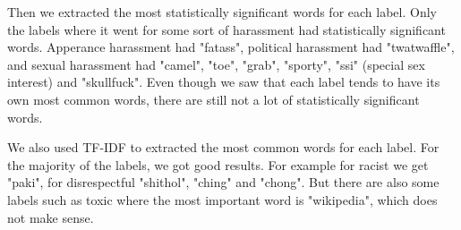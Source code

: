 \documentclass[fleqn,moreauthors,10pt]{ds_report}
\begin{document}
Then we extracted the most statistically significant words for each label. Only the labels where it went for some sort of harassment had statistically significant words. Apperance harassment had "fatass", political harassment had "twatwaffle", and sexual harassment had "camel", "toe", "grab", "sporty", "ssi" (special sex interest) and "skullfuck". Even though we saw that each label tends to have its own most common words, there are still not a lot of statistically significant words.


We also used TF-IDF to extracted the most common words for each label. For the majority of the labels, we got good results. For example for racist we get "paki", for disrespectful "shithol", "ching" and "chong". But there are also some labels such as toxic where the most important word is "wikipedia", which does not make sense. 
\end{document}

